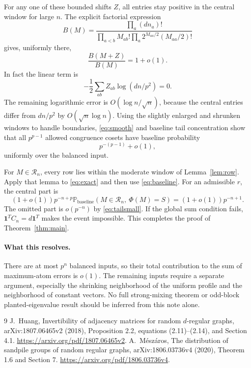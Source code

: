 \documentclass[11pt]{article}
\newcommand{\one}{\mathbf1}
\newcommand{\Prob}{\mathbb P}
\begin{document}
For any one of these bounded shifts $Z$, all entries stay positive in
the central window for large $n$. The explicit factorial expression
\[
 B(M)=\frac{\prod_a(dn_a)!}
 {\prod_{a<b}M_{ab}!\prod_a2^{M_{aa}/2}(M_{aa}/2)!}
\]
gives, uniformly there,
\begin{equation}\label{eq:smooth}
 \frac{B(M+Z)}{B(M)}=1+o(1).
\end{equation}
In fact the linear term is
\[
 -\frac12\sum_{ab}Z_{ab}\log(dn/p^2)=0.
\]
The remaining logarithmic error is $O(\log n/\sqrt n)$, because the central entries differ from
$dn/p^2$ by $O(\sqrt n\log n)$.
Using the slightly enlarged and shrunken windows to handle boundaries,
\eqref{eq:smooth} and baseline tail concentration show that all
$p^{p-1}$ allowed congruence cosets have baseline probability
\[
 p^{-(p-1)}+o(1),
\]
uniformly over the balanced input.

For $M\in\mathcal R_n$, every row lies within the moderate window of
Lemma~\ref{lem:row}. Apply that lemma to \eqref{eq:exact} and then use
\eqref{eq:baseline}. For an admissible $r$, the central part is
\[
 (1+o(1))p^{-n+p}
 \Prob_{\mathrm{baseline}}(M\in\mathcal R_n,\ \Phi(M)=S)
 =(1+o(1))p^{-n+1}.
\]
The omitted part is $o(p^{-n})$ by \eqref{eq:tailsmall}. If the global
sum condition fails, $\one^TC_n=d\one^T$ makes the event impossible.
This completes the proof of Theorem~\ref{thm:main}.

\paragraph{What this resolves.}
There are at most $p^n$ balanced inputs, so their total contribution to
the sum of maximum-atom errors is $o(1)$. The remaining inputs require
a separate argument, especially the shrinking neighborhood of the
uniform profile and the neighborhood of constant vectors. No full
strong-mixing theorem or odd-block planted-eigenvalue result should be
inferred from this note alone.

\begin{thebibliography}{9}
 J.~Huang, Invertibility of adjacency matrices for random
$d$-regular graphs, arXiv:1807.06465v2 (2018), Proposition 2.2,
equations (2.11)--(2.14), and Section 4.1.
\url{https://arxiv.org/pdf/1807.06465v2}.
 A.~M\'esz\'aros, The distribution of sandpile groups
of random regular graphs, arXiv:1806.03736v4 (2020), Theorem 1.6 and
Section 7. \url{https://arxiv.org/pdf/1806.03736v4}.
\end{thebibliography}
\end{document}
